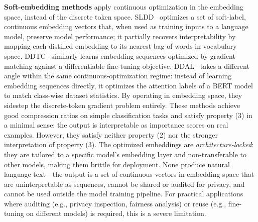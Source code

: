 \documentclass[12pt, a4paper, twoside]{book}
\numberwithin{equation}{chapter}
\theoremstyle{plain}
\theoremstyle{definition}
\theoremstyle{remark}
\newenvironment{foldable}{}{}
\newcommand*{\eg}{e.g.}
\begin{document}
\begin{foldable}
  \textbf{Soft-embedding methods} apply continuous optimization in the embedding space, instead of the discrete token space.
  SLDD~\cite{sucholutsky2021soft} optimizes a set of soft-label, continuous embedding vectors that, when used as training inputs to a language model, preserve model performance; it partially recovers interpretability by mapping each distilled embedding to its nearest bag-of-words in vocabulary space.
  DDTC~\cite{li2021data} similarly learns embedding sequences optimized by gradient matching against a differentiable fine-tuning objective.
  DDAL~\cite{maekawa2023dataset} takes a different angle within the same continuous-optimization regime: instead of learning embedding sequences directly, it optimizes the attention labels of a BERT model to match class-wise dataset statistics.
  By operating in embedding space, they sidestep the discrete-token gradient problem entirely.
  These methods achieve good compression ratios on simple classification tasks and satisfy property (3) in a minimal sense: the output is interpretable as importance scores on real examples.
  However, they satisfy neither property (2) nor the stronger interpretation of property (3).
  The optimized embeddings are \textit{architecture-locked}: they are tailored to a specific model's embedding layer and non-transferable to other models, making them brittle for deployment.
  None produce natural language text---the output is a set of continuous vectors in embedding space that are uninterpretable as sequences, cannot be shared or audited for privacy, and cannot be used outside the model training pipeline.
  For practical applications where auditing (\eg, privacy inspection, fairness analysis) or reuse (\eg, fine-tuning on different models) is required, this is a severe limitation.
\end{foldable}
\end{document}
